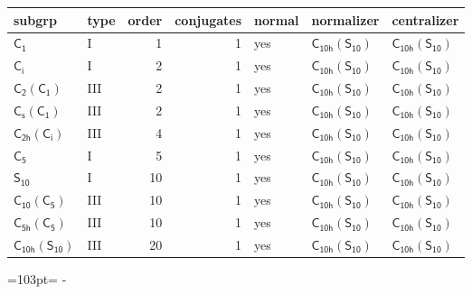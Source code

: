 \documentclass[10pt,a4paper]{article}
\newcommand{\needspace}[1]{\par\penalty-100\begingroup\dimen0=#1\relax\dimen2=\pagegoal
  \advance\dimen2-\pagetotal\ifdim\dimen0>\dimen2\relax\ifdim\dimen2>0pt\vfil\break\fi\fi
  \endgroup}
\numberwithin{equation}{section}
\newcommand{\grp}[1]{\mathsf{#1}}
\begin{document}
{\small\begin{longtable}{@{}llrrlll@{}}\toprule
subgrp & type & order & conjugates & normal & normalizer & centralizer\\\midrule\endhead
\bottomrule\endfoot\endlastfoot
\href{../../../rotation/data/pdf/C1.pdf}{$\grp{C_{1}}$} & I & 1 & 1 & yes & \href{C10h-S10.pdf}{$\grp{C_{10h}}(\grp{S_{10}})$} & \href{C10h-S10.pdf}{$\grp{C_{10h}}(\grp{S_{10}})$}\\*
\href{../../../rotation/data/pdf/S2.pdf}{$\grp{C_{i}}$} & I & 2 & 1 & yes & \href{C10h-S10.pdf}{$\grp{C_{10h}}(\grp{S_{10}})$} & \href{C10h-S10.pdf}{$\grp{C_{10h}}(\grp{S_{10}})$}\\*
\href{C2-C1.pdf}{$\grp{C_{2}}(\grp{C_{1}})$} & III & 2 & 1 & yes & \href{C10h-S10.pdf}{$\grp{C_{10h}}(\grp{S_{10}})$} & \href{C10h-S10.pdf}{$\grp{C_{10h}}(\grp{S_{10}})$}\\*
\href{C1v-C1.pdf}{$\grp{C_{s}}(\grp{C_{1}})$} & III & 2 & 1 & yes & \href{C10h-S10.pdf}{$\grp{C_{10h}}(\grp{S_{10}})$} & \href{C10h-S10.pdf}{$\grp{C_{10h}}(\grp{S_{10}})$}\\*
\href{C2h-S2.pdf}{$\grp{C_{2h}}(\grp{C_{i}})$} & III & 4 & 1 & yes & \href{C10h-S10.pdf}{$\grp{C_{10h}}(\grp{S_{10}})$} & \href{C10h-S10.pdf}{$\grp{C_{10h}}(\grp{S_{10}})$}\\*
\href{../../../rotation/data/pdf/C5.pdf}{$\grp{C_{5}}$} & I & 5 & 1 & yes & \href{C10h-S10.pdf}{$\grp{C_{10h}}(\grp{S_{10}})$} & \href{C10h-S10.pdf}{$\grp{C_{10h}}(\grp{S_{10}})$}\\*
\href{../../../rotation/data/pdf/S10.pdf}{$\grp{S_{10}}$} & I & 10 & 1 & yes & \href{C10h-S10.pdf}{$\grp{C_{10h}}(\grp{S_{10}})$} & \href{C10h-S10.pdf}{$\grp{C_{10h}}(\grp{S_{10}})$}\\*
\href{C10-C5.pdf}{$\grp{C_{10}}(\grp{C_{5}})$} & III & 10 & 1 & yes & \href{C10h-S10.pdf}{$\grp{C_{10h}}(\grp{S_{10}})$} & \href{C10h-S10.pdf}{$\grp{C_{10h}}(\grp{S_{10}})$}\\*
\href{C5h-C5.pdf}{$\grp{C_{5h}}(\grp{C_{5}})$} & III & 10 & 1 & yes & \href{C10h-S10.pdf}{$\grp{C_{10h}}(\grp{S_{10}})$} & \href{C10h-S10.pdf}{$\grp{C_{10h}}(\grp{S_{10}})$}\\*
\href{C10h-S10.pdf}{$\grp{C_{10h}}(\grp{S_{10}})$} & III & 20 & 1 & yes & \href{C10h-S10.pdf}{$\grp{C_{10h}}(\grp{S_{10}})$} & \href{C10h-S10.pdf}{$\grp{C_{10h}}(\grp{S_{10}})$}\\
\bottomrule\end{longtable}}
\needspace{103pt}
\end{document}
